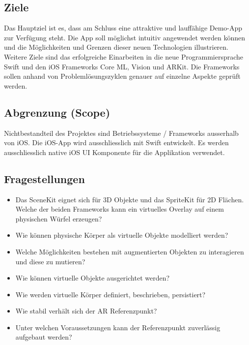 \subsection{Ziele}
Das Hauptziel ist es, dass am Schluss eine attraktive und lauffähige Demo-App zur Verfügung steht. Die App soll möglichst intuitiv angewendet werden können und die Möglichkeiten und Grenzen dieser neuen Technologien illustrieren. Weitere Ziele sind das erfolgreiche Einarbeiten in die neue Programmiersprache Swift und den iOS Frameworks Core ML, Vision und ARKit. Die Frameworks sollen anhand von Problemlösungszyklen genauer auf einzelne Aspekte geprüft werden.

\subsection{Abgrenzung (Scope)}
Nichtbestandteil des Projektes sind Betriebssysteme / Frameworks ausserhalb von iOS. Die iOS-App wird ausschliesslich mit Swift entwickelt. Es werden ausschliesslich native iOS UI Komponente für die Applikation verwendet.

\subsection{Fragestellungen}
\begin{itemize}
	\item Das SceneKit eignet sich für 3D Objekte und das SpriteKit für 2D Flächen. Welche der beiden Frameworks kann ein virtuelles Overlay auf einem physischen Würfel erzeugen?
	\item Wie können physische Körper als virtuelle Objekte modelliert werden?
	\item Welche Möglichkeiten bestehen mit augmentierten Objekten zu interagieren und diese zu mutieren?
	\item Wie können virtuelle Objekte ausgerichtet werden?
	\item Wie werden virtuelle Körper definiert, beschrieben, persistiert?
	\item Wie stabil verhält sich der AR Referenzpunkt?
	\item Unter welchen Voraussetzungen kann der Referenzpunkt zuverlässig aufgebaut werden?
\end{itemize}

